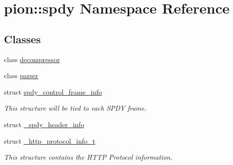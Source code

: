 \hypertarget{namespacepion_1_1spdy}{\section{pion\-:\-:spdy Namespace Reference}
\label{namespacepion_1_1spdy}
}
\subsection*{Classes}
\begin{DoxyCompactItemize}
\item 
class \hyperlink{classpion_1_1spdy_1_1decompressor}{decompressor}
\item 
class \hyperlink{classpion_1_1spdy_1_1parser}{parser}
\item 
struct \hyperlink{structpion_1_1spdy_1_1spdy__control__frame__info}{spdy\-\_\-control\-\_\-frame\-\_\-info}
\begin{DoxyCompactList}\small\item\em This structure will be tied to each S\-P\-D\-Y frame. \end{DoxyCompactList}\item 
struct \hyperlink{structpion_1_1spdy_1_1__spdy__header__info}{\-\_\-spdy\-\_\-header\-\_\-info}
\item 
struct \hyperlink{structpion_1_1spdy_1_1__http__protocol__info__t}{\-\_\-http\-\_\-protocol\-\_\-info\-\_\-t}
\begin{DoxyCompactList}\small\item\em This structure contains the H\-T\-T\-P Protocol information. \end{DoxyCompactList}\end{DoxyCompactItemize}
